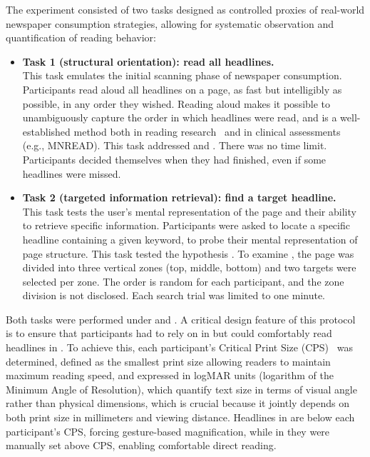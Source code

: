 The experiment consisted of two tasks designed as controlled proxies of real-world newspaper consumption strategies, allowing for systematic observation and quantification of reading behavior:
\begin{itemize}
\item {\bf Task 1 (structural orientation):  read all headlines.} \\This task emulates the initial scanning phase of newspaper consumption. Participants read aloud all headlines on a page, as fast but intelligibly as possible, in any order they wished. Reading aloud makes it possible to unambiguously capture the order in which headlines were read, and is a well-established method both in reading research~\cite{wang_understanding_2023, wang_gazeprompt_2024} and in clinical assessments (e.g., MNREAD). This task addressed \hypperformance and \hyppath. There was no time limit. Participants decided themselves when they had finished, even if some headlines were missed.

\item {\bf Task 2 (targeted information retrieval): find a target headline.} \\ This task tests the user's mental representation of the page and their ability to retrieve specific information. Participants were asked to locate a specific headline containing a given keyword, to probe their mental representation of page structure. This task tested the hypothesis \hypfindingperformance. To examine \hypfindingpositions,  the page was divided into three vertical zones (top, middle, bottom) and two targets were selected per zone. The order is random for each participant, and the zone division is not disclosed. Each search trial was limited to one minute.
\end{itemize}


Both tasks were performed under \condonenot and \condtwonot. A critical design feature of this protocol is to ensure that participants had to rely on \panzoom in \condonenot but could comfortably read headlines in \condtwonot. To achieve this,  each participant's Critical Print Size (CPS)~\cite{legge2006} was determined, defined as the smallest print size allowing readers to maintain maximum reading speed, and expressed in logMAR units (logarithm of the Minimum Angle of Resolution), which quantify text size in terms of visual angle rather than physical dimensions, which is crucial because it jointly depends on both print size in millimeters and viewing distance. Headlines in \condonenot are below each participant's CPS, forcing gesture-based magnification, while in \condtwonot they were manually set above CPS, enabling comfortable direct reading. 

